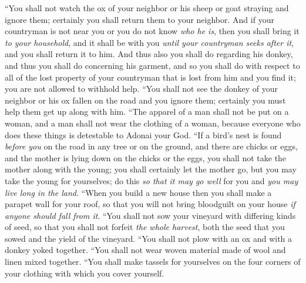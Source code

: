 \begin{biblechapter} %
\verse “You shall not watch the ox of your neighbor or his sheep or goat straying and ignore them; certainly you shall return them to your neighbor.
\verse And if your countryman is not near you or you do not know \textit{who he is}, then you shall bring it \textit{to your household}, and it shall be with you \textit{until your countryman seeks after it}, and you shall return it to him.
\verse And thus also you shall do regarding his donkey, and thus you shall do concerning his garment, and so you shall do with respect to all of the lost property of your countryman that is lost from him and you find it; you are not allowed to withhold help.
\verse “You shall not see the donkey of your neighbor or his ox fallen on the road and you ignore them; certainly you must help them get up along with him.
\verse “The apparel of a man shall not be put on a woman, and a man shall not wear the clothing of a woman, because everyone who does these things is detestable to Adonai your God.
\verse “If a bird’s nest is found \textit{before you} on the road in any tree or on the ground, and there are chicks or eggs, and the mother is lying down on the chicks or the eggs, you shall not take the mother along with the young;
\verse you shall certainly let the mother go, but you may take the young for yourselves; do this \textit{so that it may go well} for you and \textit{you may live long in the land}.
\verse “When you build a new house then you shall make a parapet wall for your roof, so that you will not bring bloodguilt on your house \textit{if anyone should fall from it}.
\verse “You shall not sow your vineyard with differing kinds of seed, so that you shall not forfeit \textit{the whole harvest}, both the seed that you sowed and the yield of the vineyard.
\verse “You shall not plow with an ox and with a donkey yoked together.
\verse “You shall not wear woven material made of wool and linen mixed together.
\verse “You shall make tassels for yourselves on the four corners of your clothing with which you cover yourself.

\end{biblechapter}
